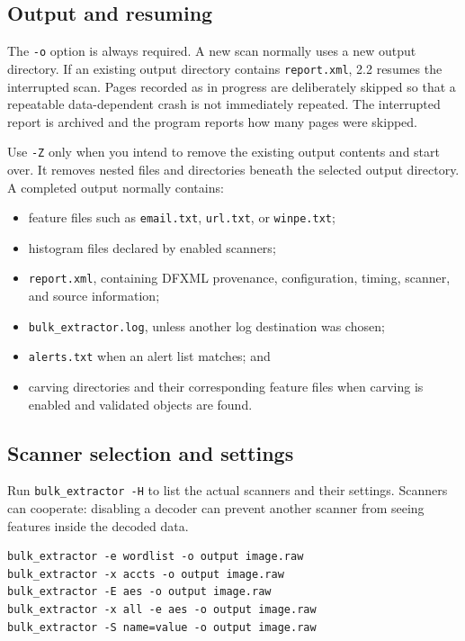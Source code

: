 \documentclass[11pt]{article}
\newcommand{\code}[1]{\texttt{#1}}
\begin{document}
\subsection{Output and resuming}

The \code{-o} option is always required. A new scan normally uses a new output
directory. If an existing output directory contains \code{report.xml}, 2.2
resumes the interrupted scan. Pages recorded as in progress are deliberately
skipped so that a repeatable data-dependent crash is not immediately repeated.
The interrupted report is archived and the program reports how many pages were
skipped.

Use \code{-Z} only when you intend to remove the existing output contents and
start over. It removes nested files and directories beneath the selected
output directory. A completed output normally contains:

\begin{itemize}
\item feature files such as \code{email.txt}, \code{url.txt}, or
  \code{winpe.txt};
\item histogram files declared by enabled scanners;
\item \code{report.xml}, containing DFXML provenance, configuration, timing,
  scanner, and source information;
\item \code{bulk\_extractor.log}, unless another log destination was chosen;
\item \code{alerts.txt} when an alert list matches; and
\item carving directories and their corresponding feature files when carving
  is enabled and validated objects are found.
\end{itemize}

\subsection{Scanner selection and settings}

Run \code{bulk\_extractor -H} to list the actual scanners and their settings.
Scanners can cooperate: disabling a decoder can prevent another scanner from
seeing features inside the decoded data.

\begin{Verbatim}
bulk_extractor -e wordlist -o output image.raw
bulk_extractor -x accts -o output image.raw
bulk_extractor -E aes -o output image.raw
bulk_extractor -x all -e aes -o output image.raw
bulk_extractor -S name=value -o output image.raw
\end{Verbatim}
\end{document}

